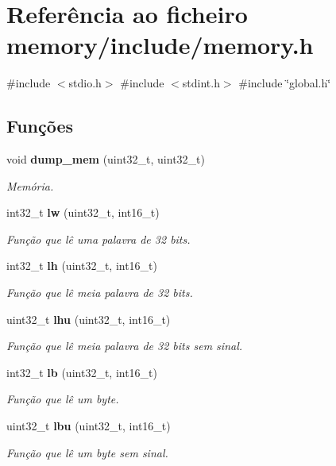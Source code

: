 \section{Referência ao ficheiro memory/include/memory.h}
\label{memory_8h}
{\ttfamily \#include $<$stdio.\+h$>$}\newline
{\ttfamily \#include $<$stdint.\+h$>$}\newline
{\ttfamily \#include \char`\"{}global.\+h\char`\"{}}\newline
\subsection*{Funções}
\begin{DoxyCompactItemize}
\item 
void \textbf{ dump\+\_\+mem} (uint32\+\_\+t, uint32\+\_\+t)
\begin{DoxyCompactList}\small\item\em Memória. \end{DoxyCompactList}\item 
int32\+\_\+t \textbf{ lw} (uint32\+\_\+t, int16\+\_\+t)
\begin{DoxyCompactList}\small\item\em Função que lê uma palavra de 32 bits. \end{DoxyCompactList}\item 
int32\+\_\+t \textbf{ lh} (uint32\+\_\+t, int16\+\_\+t)
\begin{DoxyCompactList}\small\item\em Função que lê meia palavra de 32 bits. \end{DoxyCompactList}\item 
uint32\+\_\+t \textbf{ lhu} (uint32\+\_\+t, int16\+\_\+t)
\begin{DoxyCompactList}\small\item\em Função que lê meia palavra de 32 bits sem sinal. \end{DoxyCompactList}\item 
int32\+\_\+t \textbf{ lb} (uint32\+\_\+t, int16\+\_\+t)
\begin{DoxyCompactList}\small\item\em Função que lê um byte. \end{DoxyCompactList}\item 
uint32\+\_\+t \textbf{ lbu} (uint32\+\_\+t, int16\+\_\+t)
\begin{DoxyCompactList}\small\item\em Função que lê um byte sem sinal. \end{DoxyCompactList}\item 

\end{DoxyCompactItemize}
